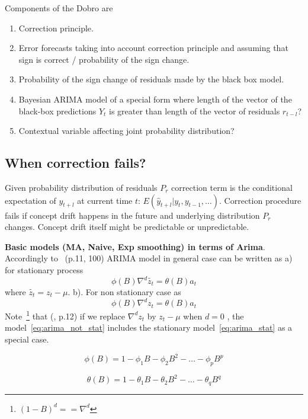\documentclass[paper=a4, fontsize=12pt]{article}
\begin{document}
Components of the Dobro are
\begin{enumerate}
\item Correction principle.
\item Error forecasts taking into account correction principle and assuming that sign is correct / probability of the sign change.
\item Probability of the sign change of residuals made by the black box model.
\item Bayesian ARIMA model of a special form where length of the vector of the black-box predictions $Y_t$ is greater than length of the vector of residuals $r_{t-l}$?
\item Contextual variable affecting joint probability distribution?
\end{enumerate}

\subsection{When correction fails?}
Given probability distribution of residuals $P_r$ correction term is the conditional expectation of $y_{t+l}$ at current time $t$: $E(\hat y_{t+l} | y_t, y_{t-1}, \dots )$.
Correction procedure fails if concept drift happens in the future and underlying distribution $P_r$ changes. Concept drift itself might be predictable or unpredictable.
 
\textbf{Basic models (MA, Naive, Exp smoothing) in terms of Arima}.\\
Accordingly to~\cite{Box_Jenkins_Arima} (p.11, 100) ARIMA model in general case can be written as 
a) for stationary process
\begin{equation}
\phi(B) \nabla^d \tilde{z_t} = \theta(B) a_t
\label{eq:arima_stat}
\end{equation}
where $\tilde{z_t} = z_t - \mu$.
b). For non stationary case as
\begin{equation}
\phi(B) \nabla^d z_t = \theta(B) a_t
\label{eq:arima_not_stat}
\end{equation}
Note~\footnote{$(1-B)^d  == \nabla^d$} that
(\cite{Box_Jenkins_Arima}, p.12) if we replace $\nabla^d z_t$ by $z_t - \mu$ when $d=0$ , the model~\ref{eq:arima_not_stat} includes the stationary model~\ref{eq:arima_stat} as a special case.
 
\begin{equation}
\phi(B) = 1 - \phi_1 B - \phi_2 B^2 - \dots - \phi_p B^p
\label{eq:phi_b}
\end{equation}

\begin{equation}
\theta (B) = 1 - \theta_1 B - \theta_2 B^2 - \dots - \theta_q B^q
\end{equation}
\end{document}
